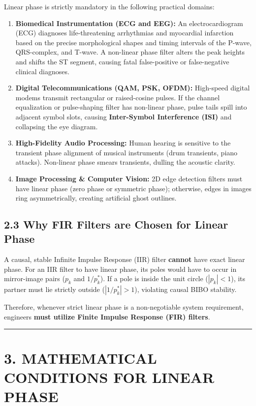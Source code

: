 \documentclass[11pt,a4paper]{article}
\begin{document}
Linear phase is strictly mandatory in the following practical domains:
\begin{enumerate}
    \item \textbf{Biomedical Instrumentation (ECG and EEG):} An electrocardiogram (ECG) diagnoses life-threatening arrhythmias and myocardial infarction based on the precise morphological shapes and timing intervals of the P-wave, QRS-complex, and T-wave. A non-linear phase filter alters the peak heights and shifts the ST segment, causing fatal false-positive or false-negative clinical diagnoses.
    \item \textbf{Digital Telecommunications (QAM, PSK, OFDM):} High-speed digital modems transmit rectangular or raised-cosine pulses. If the channel equalization or pulse-shaping filter has non-linear phase, pulse tails spill into adjacent symbol slots, causing \textbf{Inter-Symbol Interference (ISI)} and collapsing the eye diagram.
    \item \textbf{High-Fidelity Audio Processing:} Human hearing is sensitive to the transient phase alignment of musical instruments (drum transients, piano attacks). Non-linear phase smears transients, dulling the acoustic clarity.
    \item \textbf{Image Processing \& Computer Vision:} 2D edge detection filters must have linear phase (zero phase or symmetric phase); otherwise, edges in images ring asymmetrically, creating artificial ghost outlines.
\end{enumerate}

\subsection{2.3 Why FIR Filters are Chosen for Linear Phase}
A causal, stable Infinite Impulse Response (IIR) filter \textbf{cannot} have exact linear phase. For an IIR filter to have linear phase, its poles would have to occur in mirror-image pairs ($p_k$ and $1/p_k^*$). If a pole is inside the unit circle ($|p_k| < 1$), its partner must lie strictly outside ($|1/p_k^*| > 1$), violating causal BIBO stability.

Therefore, whenever strict linear phase is a non-negotiable system requirement, engineers \textbf{must utilize Finite Impulse Response (FIR) filters}.

\noindent\rule{\textwidth}{0.5pt}

\section{3. MATHEMATICAL CONDITIONS FOR LINEAR PHASE}
\end{document}
